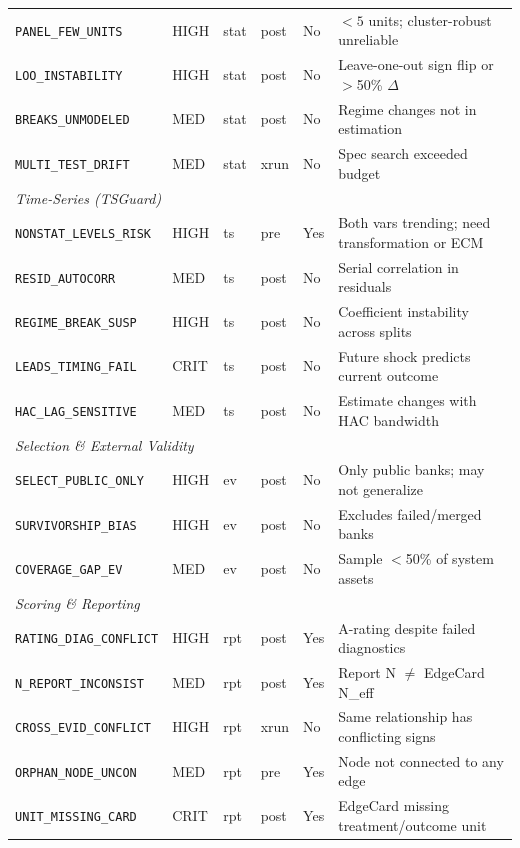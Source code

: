 \documentclass{article}
\begin{document}
\begin{table}[htbp]
\begin{tabular}{@{}lllllp{4.2cm}@{}}
\texttt{PANEL\_FEW\_UNITS} & HIGH & stat & post & No & $<5$ units; cluster-robust unreliable \\
\texttt{LOO\_INSTABILITY} & HIGH & stat & post & No & Leave-one-out sign flip or $>$50\% $\Delta$ \\
\texttt{BREAKS\_UNMODELED} & MED & stat & post & No & Regime changes not in estimation \\
\texttt{MULTI\_TEST\_DRIFT} & MED & stat & xrun & No & Spec search exceeded budget \\
\midrule
\multicolumn{6}{l}{\textit{Time-Series (TSGuard)}} \\
\texttt{NONSTAT\_LEVELS\_RISK} & HIGH & ts & pre & Yes & Both vars trending; need transformation or ECM \\
\texttt{RESID\_AUTOCORR} & MED & ts & post & No & Serial correlation in residuals \\
\texttt{REGIME\_BREAK\_SUSP} & HIGH & ts & post & No & Coefficient instability across splits \\
\texttt{LEADS\_TIMING\_FAIL} & CRIT & ts & post & No & Future shock predicts current outcome \\
\texttt{HAC\_LAG\_SENSITIVE} & MED & ts & post & No & Estimate changes with HAC bandwidth \\
\midrule
\multicolumn{6}{l}{\textit{Selection \& External Validity}} \\
\texttt{SELECT\_PUBLIC\_ONLY} & HIGH & ev & post & No & Only public banks; may not generalize \\
\texttt{SURVIVORSHIP\_BIAS} & HIGH & ev & post & No & Excludes failed/merged banks \\
\texttt{COVERAGE\_GAP\_EV} & MED & ev & post & No & Sample $<$50\% of system assets \\
\midrule
\multicolumn{6}{l}{\textit{Scoring \& Reporting}} \\
\texttt{RATING\_DIAG\_CONFLICT} & HIGH & rpt & post & Yes & A-rating despite failed diagnostics \\
\texttt{N\_REPORT\_INCONSIST} & MED & rpt & post & Yes & Report N $\neq$ EdgeCard N\_eff \\
\texttt{CROSS\_EVID\_CONFLICT} & HIGH & rpt & xrun & No & Same relationship has conflicting signs \\
\texttt{ORPHAN\_NODE\_UNCON} & MED & rpt & pre & Yes & Node not connected to any edge \\
\texttt{UNIT\_MISSING\_CARD} & CRIT & rpt & post & Yes & EdgeCard missing treatment/outcome unit \\
\midrule

\end{tabular}
\end{table}
\end{document}
